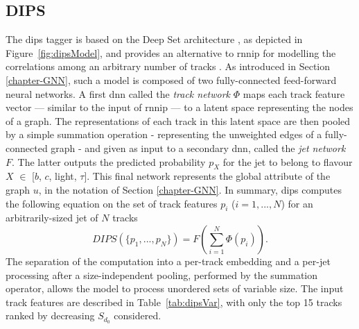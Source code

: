 \subsection{DIPS}
The \gls{dips} tagger is based on the Deep Set architecture \cite{NIPS2017f22e4747}, as depicted in Figure~\ref{fig:dipsModel}, and provides an alternative to \gls{rnnip} for modelling the correlations among an arbitrary number of tracks \cite{ATL-PHYS-PUB-2020-014}. As introduced in Section \ref{chapter-GNN}, such a model is composed of two fully-connected feed-forward neural networks. A first \gls{dnn} called the \textit{track network} $\Phi$ maps each track feature vector — similar to the input of \gls{rnnip} — to a latent space representing the nodes of a graph. The representations of each track in this latent space are then pooled by a simple summation operation - representing the unweighted edges of a fully-connected graph - and given as input to a secondary \gls{dnn}, called the \textit{jet network} $F$. The latter outputs the predicted probability $p_X$ for the jet to belong to flavour $X$ $\in$ [$b$, $c$, light, $\tau$]. This final network represents the global attribute of the graph $u$, in the notation of Section \ref{chapter-GNN}. In summary, \gls{dips} computes the following equation on the set of track features ${ p_i }$ ($i = 1, ..., N$) for an arbitrarily-sized jet of $N$ tracks
\begin{equation}
  DIPS( \{p_1, ..., p_N \} ) = F\left( \sum_{i=1}^N \Phi(p_i) \right).
\end{equation}
The separation of the computation into a per-track embedding and a per-jet processing after a size-independent pooling, performed by the summation operator, allows the model to process unordered sets of variable size. The input track features are described in Table~\ref{tab:dipsVar}, with only the top 15 tracks ranked by decreasing $S_{d_0}$ considered. \\

